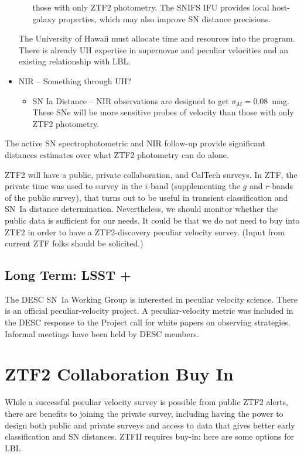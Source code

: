 \documentclass[11pt, oneside]{article}   	%
\begin{document}
\begin{itemize}
\begin{itemize}
those with only ZTF2 photometry.  The SNIFS IFU provides local host-galaxy properties, which may also improve SN distance precisions.
\end{itemize}
The University of Hawaii must allocate time and resources into the program.  There is already UH expertise in supernovae and peculiar velocities and an existing relationship
with LBL.
\item NIR -- Something through UH?
\begin{itemize}
\item SN Ia Distance -- NIR observations are designed to get $\sigma_M=0.08$~mag.  These SNe will be more sensitive probes of velocity
than those with only ZTF2 photometry.
\end{itemize}
\end{itemize}
The active SN spectrophotometric and NIR follow-up provide significant distances estimates over
what ZTF2 photometry can do alone.




ZTF2 will have a public, private collaboration, and CalTech surveys.    In ZTF,
the private time was used to survey in the $i$-band (supplementing the $g$ and $r$-bands of the public survey), that turns out to be useful in transient classification and SN~Ia distance determination.
Nevertheless, we should monitor whether the public data is sufficient for our needs.  It could be that we do not need to buy into ZTF2 in order to have
a ZTF2-discovery peculiar velocity survey.  (Input from current ZTF folks should be solicited.)

\subsection{Long Term: LSST +}
The DESC SN~Ia Working Group is interested in peculiar velocity science.  There is an official peculiar-velocity project.  A peculiar-velocity
metric was included in the DESC response to the Project call for white papers on observing strategies.
Informal meetings have been held by DESC members.



\section{ZTF2 Collaboration Buy In}

While a successful peculiar velocity survey is possible from public ZTF2 alerts,
there are benefits to joining the private survey, including having the power to design both public and private surveys and
access to data that gives better early classification and SN distances.
ZTFII requires buy-in: here are some options for LBL
\end{document}

